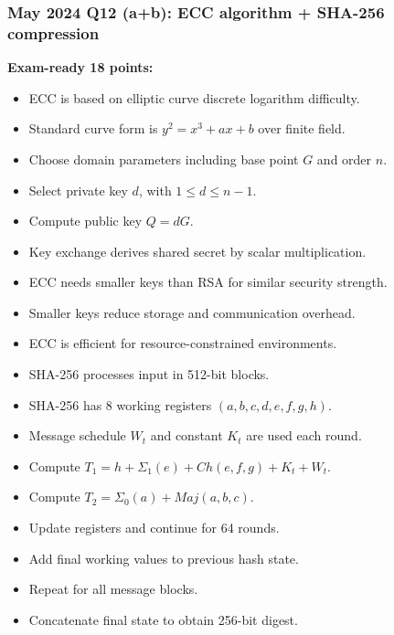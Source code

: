\documentclass[12pt,a4paper]{article}
\begin{document}
\subsubsection*{May 2024 Q12 (a+b): ECC algorithm + SHA-256 compression}
\textbf{Exam-ready 18 points:}
\begin{itemize}
\item ECC is based on elliptic curve discrete logarithm difficulty.
\item Standard curve form is \(y^2=x^3+ax+b\) over finite field.
\item Choose domain parameters including base point \(G\) and order \(n\).
\item Select private key \(d\), with \(1\le d \le n-1\).
\item Compute public key \(Q=dG\).
\item Key exchange derives shared secret by scalar multiplication.
\item ECC needs smaller keys than RSA for similar security strength.
\item Smaller keys reduce storage and communication overhead.
\item ECC is efficient for resource-constrained environments.
\item SHA-256 processes input in 512-bit blocks.
\item SHA-256 has 8 working registers \((a,b,c,d,e,f,g,h)\).
\item Message schedule \(W_t\) and constant \(K_t\) are used each round.
\item Compute \(T_1 = h + \Sigma_1(e) + Ch(e,f,g) + K_t + W_t\).
\item Compute \(T_2 = \Sigma_0(a) + Maj(a,b,c)\).
\item Update registers and continue for 64 rounds.
\item Add final working values to previous hash state.
\item Repeat for all message blocks.
\item Concatenate final state to obtain 256-bit digest.
\end{itemize}
\end{document}
